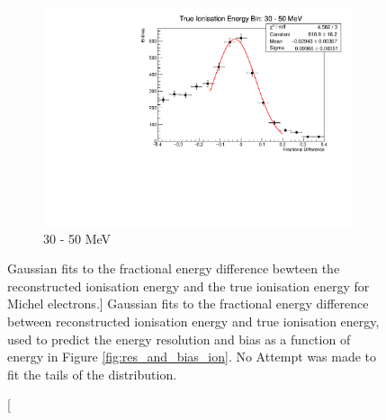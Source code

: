 \begin{figure}
\begin{subfigure}[b]{0.49\textwidth}
		\includegraphics[width=\textwidth]{figures/ion_res_30.pdf}
		\caption {30 - 50 MeV}
	\end{subfigure}

	\caption
	[Gaussian fits to the fractional energy difference bewteen the reconstructed
	ionisation energy and the true ionisation energy for Michel electrons.]
	{Gaussian fits to the fractional energy difference between 
		reconstructed ionisation energy and true ionisation energy, used to predict 
		the energy resolution and bias as a function of energy in Figure 
		\ref{fig:res_and_bias_ion}. No Attempt was made to fit the tails of the
		distribution.}
	\label{fig:ionisation_fits}

\end{figure}
